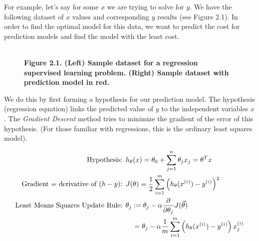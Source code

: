\documentclass[letterpaper,10pt]{article}
\begin{document}
For example, let's say for some $x$ we are trying to solve for $y$. We have the following dataset of $x$ values and corresponding $y$ results (see Figure 2.1). In order to find the optimal model for this data, we want to predict the cost for prediction models and find the model with the least cost.
\begin{figure}
\centering
{}
\\
{\bf Figure 2.1. (Left) Sample dataset for a regression supervised learning problem. (Right) Sample dataset with prediction model in red.} 
\end{figure}

We do this by first forming a hypothesis for our prediction model. The hypothesis (regression equation) links the predicted value of $y$ to the independent variables $x$. The \textit{Gradient Descent} method tries to minimize the gradient of the error of this hypothesis. (For those familiar with regressions, this is the ordinary least squares model).

\begin{align}
\text{Hypothesis: }& h_\theta (x) = \theta_0 + \sum_{j=1}^n \theta_j x_j = \theta^T x\\
\text{Gradient = derivative of }(h-y)\text{: }& J(\theta)=\frac{1}{2} \sum_{i=1}^m \left( h_{\theta}(x^{(i)}) - y^{(i)}  \right)^2 \\
\text{Least Means Squares Update Rule: }& \theta_j := \theta_j - \alpha \frac{\partial}{\partial \theta_j} J(\vec \theta) \label{EqnLMS} \\
&\quad = \theta_j - \alpha \frac{1}{m} \sum_{i=1}^m \left( h_{\theta}(x^{(i)}) - y^{(i)}  \right) x_j^{(i)} \notag
\end{align}
\end{document}
